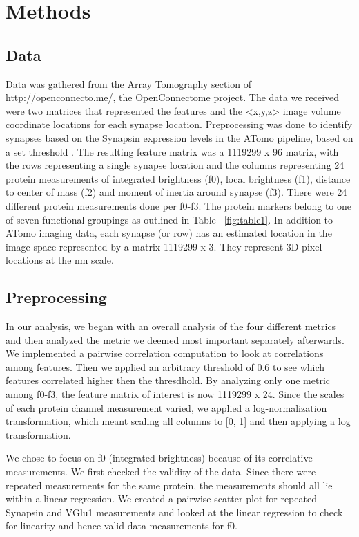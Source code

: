 \documentclass{article}
\begin{document}
\section{Methods}
\label{methods}

\subsection{Data}
Data was gathered from the Array Tomography section of http://openconnecto.me/, the OpenConnectome project. The data we received were two matrices that represented the features and the <x,y,z> image volume coordinate locations for each synapse location. Preprocessing was done to identify synapses based on the Synapsin expression levels in the ATomo pipeline, based on a set threshold \cite{Weiler2014}. The resulting feature matrix was a 1119299 x 96 matrix, with the rows representing a single synapse location and the columns representing 24 protein measurements of integrated brightness (f0), local brightness (f1), distance to center of mass (f2) and moment of inertia around synapse (f3). There were 24 different protein measurements done per f0-f3. The protein markers belong to one of seven functional groupings as outlined in Table ~\ref{fig:table1}. In addition to ATomo imaging data, each synapse (or row) has an estimated location in the image space represented by a matrix 1119299 x 3. They represent 3D pixel locations at the nm scale. 

\subsection{Preprocessing}
In our analysis, we began with an overall analysis of the four different metrics and then analyzed the metric we deemed most important separately afterwards. We implemented a pairwise correlation computation to look at correlations among features. Then we applied an arbitrary threshold of 0.6 to see which features correlated higher then the thresdhold. By analyzing only one metric among f0-f3, the feature matrix of interest is now 1119299 x 24. Since the scales of each protein channel measurement varied, we applied a log-normalization transformation, which meant scaling all columns to [0, 1] and then applying a log transformation.

We chose to focus on f0 (integrated brightness) because of its correlative measurements. We first checked the validity of the data. Since there were repeated measurements for the same protein, the measurements should all lie within a linear regression. We created a pairwise scatter plot for repeated Synapsin and VGlu1 measurements and looked at the linear regression to check for linearity and hence valid data measurements for f0.
\end{document}
